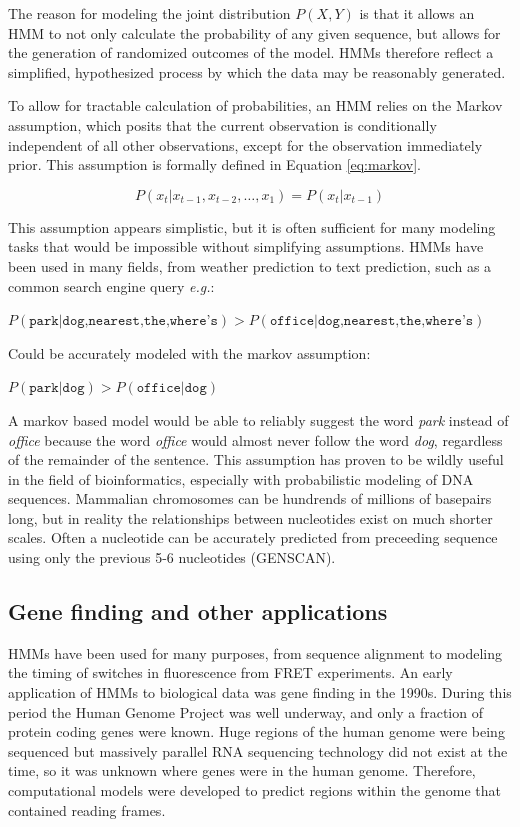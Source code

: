The reason for modeling the joint distribution $P(X,Y)$ is that it allows an HMM to not only calculate the probability of any given sequence, but allows for the generation of randomized outcomes of the model. HMMs therefore reflect a simplified, hypothesized process by which the data may be reasonably generated.

To allow for tractable calculation of probabilities, an HMM relies on the Markov assumption, which posits that the current observation is conditionally independent of all other observations, except for the observation immediately prior. This assumption is formally defined in Equation \ref{eq:markov}.

\begin{equation}
    P(x_t|x_{t-1},x_{t-2},\dots,x_1) = P(x_t | x_{t-1})
\label{eq:markov}
\end{equation}

This assumption appears simplistic, but it is often sufficient for many modeling tasks that would be impossible without simplifying assumptions. HMMs have been used in many fields, from weather prediction to text prediction, such as a common search engine query \emph{e.g.}: 

\begin{center}
    $P(\texttt{park} | \texttt{dog,nearest,the,where's}) > P(\texttt{office} | \texttt{dog,nearest,the,where's}) $
\end{center}

Could be accurately modeled with the markov assumption:

\begin{center}
    $P(\texttt{park} | \texttt{dog}) > P(\texttt{office} | \texttt{dog}) $
\end{center}

A markov based model would be able to reliably suggest the word \emph{park} instead of \emph{office} because the word \emph{office} would almost never follow the word \emph{dog}, regardless of the remainder of the sentence. This assumption has proven to be wildly useful in the field of bioinformatics, especially with probabilistic modeling of DNA sequences. Mammalian chromosomes can be hundrends of millions of basepairs long, but in reality the relationships between nucleotides exist on much shorter scales. Often a nucleotide can be accurately predicted from preceeding sequence using only the previous 5-6 nucleotides (GENSCAN).

\subsection{Gene finding and other applications}
HMMs have been used for many purposes, from sequence alignment to modeling the timing of switches in fluorescence from FRET experiments. An early application of HMMs to biological data was gene finding in the 1990s. During this period the Human Genome Project was well underway, and only a fraction of protein coding genes were known. Huge regions of the human genome were being sequenced but massively parallel RNA sequencing technology did not exist at the time, so it was unknown where genes were in the human genome. Therefore, computational models were developed to predict regions within the genome that contained reading frames. 

